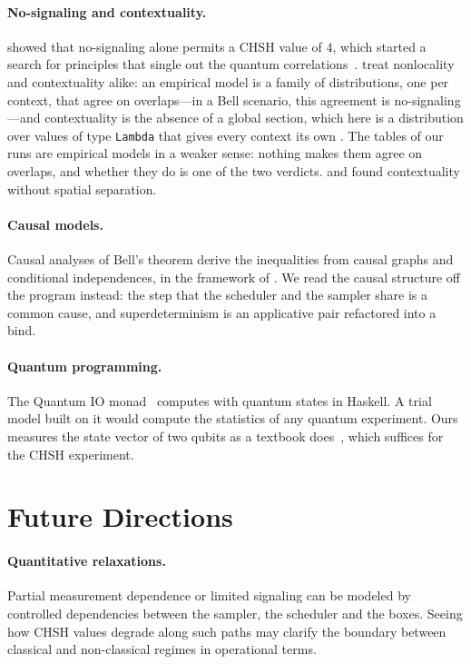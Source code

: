 \documentclass[11pt]{article}
\newcommand{\hs}{\lstinline[style=hask,basicstyle=\ttfamily,frame=none]}
\begin{document}
\paragraph{No-signaling and contextuality.} \citet{PopescuRohrlich1994} showed that no-signaling alone permits a CHSH value of $4$, which started a search for principles that single out the quantum correlations~\citep{Brunner2014}. \citet{AbramskyBrandenburger2011} treat nonlocality and contextuality alike: an empirical model is a family of distributions, one per context, that agree on overlaps---in a Bell scenario, this agreement is no-signaling---and contextuality is the absence of a global section, which here is a distribution over values of type \hs|Lambda| that gives every context its own \citep[see also][]{Abramsky2013,Abramsky2015}. The tables of our runs are empirical models in a weaker sense: nothing makes them agree on overlaps, and whether they do is one of the two verdicts. \citet{Specker1960} and \citet{KochenSpecker1967} found contextuality without spatial separation.

\paragraph{Causal models.} Causal analyses of Bell's theorem derive the inequalities from causal graphs and conditional independences, in the framework of \citet{Pearl2009}. We read the causal structure off the program instead: the step that the scheduler and the sampler share is a common cause, and superdeterminism is an applicative pair refactored into a bind.

\paragraph{Quantum programming.} The Quantum IO monad~\citep{AltenkirchGreen2010} computes with quantum states in Haskell. A trial model built on it would compute the statistics of any quantum experiment. Ours measures the state vector of two qubits as a textbook does~\citep{NielsenChuang2010}, which suffices for the CHSH experiment.

\section{Future Directions}\label{sec:future}

\paragraph{Quantitative relaxations.} Partial measurement dependence or limited signaling can be modeled by controlled dependencies between the sampler, the scheduler and the boxes. Seeing how CHSH values degrade along such paths may clarify the boundary between classical and non-classical regimes in operational terms.
\end{document}
